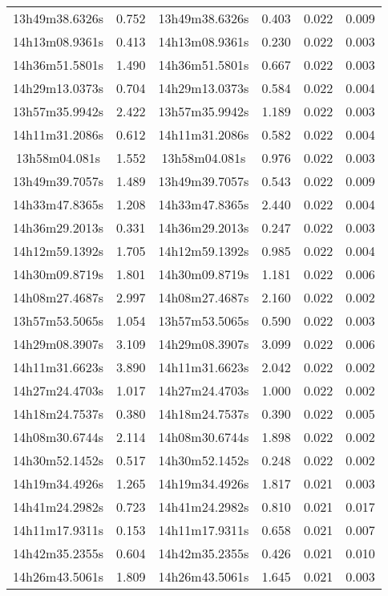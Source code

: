 \begin{table}
\begin{tabular}{cccccc}
13h49m38.6326s & 0.752 & 13h49m38.6326s & 0.403 & 0.022 & 0.009 \\
14h13m08.9361s & 0.413 & 14h13m08.9361s & 0.230 & 0.022 & 0.003 \\
14h36m51.5801s & 1.490 & 14h36m51.5801s & 0.667 & 0.022 & 0.003 \\
14h29m13.0373s & 0.704 & 14h29m13.0373s & 0.584 & 0.022 & 0.004 \\
13h57m35.9942s & 2.422 & 13h57m35.9942s & 1.189 & 0.022 & 0.003 \\
14h11m31.2086s & 0.612 & 14h11m31.2086s & 0.582 & 0.022 & 0.004 \\
13h58m04.081s & 1.552 & 13h58m04.081s & 0.976 & 0.022 & 0.003 \\
13h49m39.7057s & 1.489 & 13h49m39.7057s & 0.543 & 0.022 & 0.009 \\
14h33m47.8365s & 1.208 & 14h33m47.8365s & 2.440 & 0.022 & 0.004 \\
14h36m29.2013s & 0.331 & 14h36m29.2013s & 0.247 & 0.022 & 0.003 \\
14h12m59.1392s & 1.705 & 14h12m59.1392s & 0.985 & 0.022 & 0.004 \\
14h30m09.8719s & 1.801 & 14h30m09.8719s & 1.181 & 0.022 & 0.006 \\
14h08m27.4687s & 2.997 & 14h08m27.4687s & 2.160 & 0.022 & 0.002 \\
13h57m53.5065s & 1.054 & 13h57m53.5065s & 0.590 & 0.022 & 0.003 \\
14h29m08.3907s & 3.109 & 14h29m08.3907s & 3.099 & 0.022 & 0.006 \\
14h11m31.6623s & 3.890 & 14h11m31.6623s & 2.042 & 0.022 & 0.002 \\
14h27m24.4703s & 1.017 & 14h27m24.4703s & 1.000 & 0.022 & 0.002 \\
14h18m24.7537s & 0.380 & 14h18m24.7537s & 0.390 & 0.022 & 0.005 \\
14h08m30.6744s & 2.114 & 14h08m30.6744s & 1.898 & 0.022 & 0.002 \\
14h30m52.1452s & 0.517 & 14h30m52.1452s & 0.248 & 0.022 & 0.002 \\
14h19m34.4926s & 1.265 & 14h19m34.4926s & 1.817 & 0.021 & 0.003 \\
14h41m24.2982s & 0.723 & 14h41m24.2982s & 0.810 & 0.021 & 0.017 \\
14h11m17.9311s & 0.153 & 14h11m17.9311s & 0.658 & 0.021 & 0.007 \\
14h42m35.2355s & 0.604 & 14h42m35.2355s & 0.426 & 0.021 & 0.010 \\
14h26m43.5061s & 1.809 & 14h26m43.5061s & 1.645 & 0.021 & 0.003 \\

\end{tabular}
\end{table}
